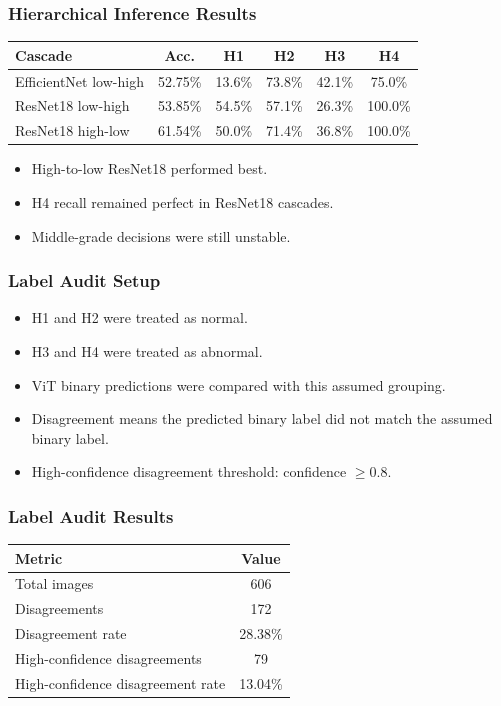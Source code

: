 \documentclass{beamer}
\begin{document}
\begin{frame}
\frametitle{Hierarchical Inference Results}
\begin{center}
\begin{tabular}{lccccc}
\toprule
\textbf{Cascade} & \textbf{Acc.} & \textbf{H1} & \textbf{H2} & \textbf{H3} & \textbf{H4}\\
\midrule
EfficientNet low-high & 52.75\% & 13.6\% & 73.8\% & 42.1\% & 75.0\%\\
ResNet18 low-high & 53.85\% & 54.5\% & 57.1\% & 26.3\% & 100.0\%\\
ResNet18 high-low & 61.54\% & 50.0\% & 71.4\% & 36.8\% & 100.0\%\\
\bottomrule
\end{tabular}
\end{center}
\begin{itemize}
\item High-to-low ResNet18 performed best.
\item H4 recall remained perfect in ResNet18 cascades.
\item Middle-grade decisions were still unstable.
\end{itemize}
\end{frame}

\begin{frame}
\frametitle{Label Audit Setup}
\begin{itemize}
\item H1 and H2 were treated as normal.
\item H3 and H4 were treated as abnormal.
\item ViT binary predictions were compared with this assumed grouping.
\item Disagreement means the predicted binary label did not match the assumed binary label.
\item High-confidence disagreement threshold: confidence $\geq 0.8$.
\end{itemize}
\end{frame}

\begin{frame}
\frametitle{Label Audit Results}
\begin{center}
\begin{tabular}{lc}
\toprule
\textbf{Metric} & \textbf{Value}\\
\midrule
Total images & 606\\
Disagreements & 172\\
Disagreement rate & 28.38\%\\
High-confidence disagreements & 79\\
High-confidence disagreement rate & 13.04\%\\
\bottomrule
\end{tabular}
\end{center}
\end{frame}
\end{document}
